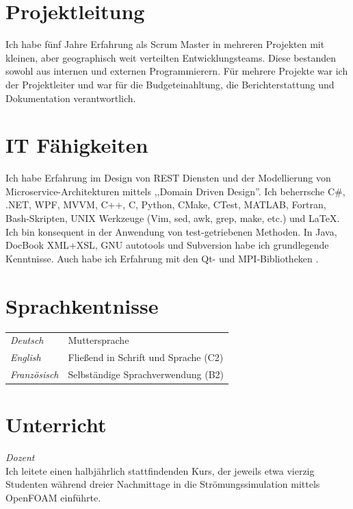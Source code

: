 \documentclass[line,11pt,a4paper]{../resume}
\begin{document}
\begin{resume}
\section{\mysidestyle Projektleitung}\vspace{2mm}
Ich habe f\"unf Jahre Erfahrung als Scrum Master in mehreren Projekten mit
kleinen, aber geographisch weit verteilten Entwicklungsteams. Diese bestanden
sowohl aus internen und externen Programmierern. F\"ur mehrere Projekte war ich
der Projektleiter und war f\"ur die Budgeteinahltung, die Berichterstattung und
Dokumentation verantwortlich.

\section{\mysidestyle IT F\"ahigkeiten}\vspace{2mm}
Ich habe Erfahrung im Design von REST Diensten und der Modellierung von
Microservice-Architekturen mittels ,,Domain Driven Design''. Ich beherrsche
C\#, .NET, WPF, MVVM, C++, C, Python, CMake, CTest, MATLAB, Fortran,
Bash-Skripten, UNIX Werkzeuge (Vim, sed, awk, grep, make, etc.) und
{\selectfont\LaTeX}. Ich bin konsequent in der Anwendung von
test-getriebenen Methoden. In Java, DocBook XML+XSL, GNU autotools und
Subversion habe ich grundlegende Kenntnisse. Auch habe ich Erfahrung mit den
Qt- und MPI-Bibliotheken .

\section{\mysidestyle Sprachkentnisse}\vspace{2mm}
\begin{tabular}{@{}ll}
  \textsl{Deutsch}   & Muttersprache \\
  \textsl{English}  & Flie{\ss}end in Schrift und Sprache (C2) \\
  \textsl{Franz\"osisch}  & Selbst\"andige Sprachverwendung (B2) \\
\end{tabular}

\section{\mysidestyle Unterricht}\vspace{2mm}

\textsl{Dozent}\\
Ich leitete einen halbj\"ahrlich stattfindenden Kurs, der jeweils etwa vierzig
Studenten w\"ahrend dreier Nachmittage in die Str\"omungssimulation mittels
OpenFOAM einf\"uhrte.


\end{resume}
\end{document}
